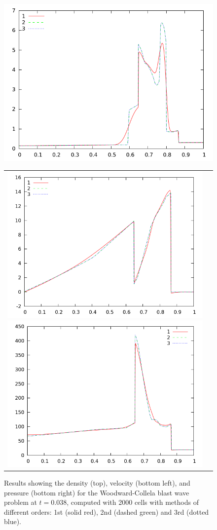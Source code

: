 \documentclass[10pt]{article}
\begin{document}
\begin{figure}[h]
  \begin{center}
     \includegraphics[width=.95\textwidth]{den_T12_2000.png}
	\begin{tabular}{cc}
     \includegraphics[width=.475\textwidth]{vel_T12_2000.png}
     \includegraphics[width=.475\textwidth]{prs_T12_2000.png}	
    \end{tabular}	
  \end{center}
  \caption{Results showing the density (top), velocity (bottom left), and pressure (bottom right) for the Woodward-Collela blast wave problem at $t=0.038$, computed with 2000 cells with methods of different orders: 1st (solid red), 2nd (dashed green) and 3rd (dotted blue).}
  \label{fig:den_T12_2000}
\end{figure}
\end{document}
